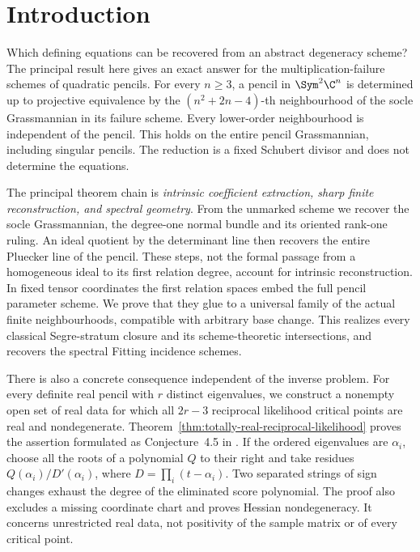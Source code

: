 \section{Introduction}
\label{sec:introduction-v132}

Which defining equations can be recovered from an abstract degeneracy
scheme?  The principal result here gives an exact answer for the
multiplication-failure schemes of quadratic pencils.  For every
\(n\ge3\), a pencil in \(\Sym^2\C^n\) is determined up to
projective equivalence by the \((n^2+2n-4)\)-th neighbourhood
of the socle Grassmannian in its failure scheme.  Every lower-order
neighbourhood is independent of the pencil.  This holds on the entire
pencil Grassmannian, including singular pencils.  The reduction is a
fixed Schubert divisor and does not determine the equations.

The principal theorem chain is
\emph{intrinsic coefficient extraction, sharp finite reconstruction,
and spectral geometry}.  From the unmarked scheme we recover the
socle Grassmannian, the degree-one normal bundle and its oriented
rank-one ruling.  An ideal quotient by the determinant line then
recovers the entire Pluecker line of the pencil.  These steps, not
the formal passage from a homogeneous ideal to its first relation
degree, account for intrinsic reconstruction.  In fixed tensor
coordinates the first relation spaces embed the full pencil parameter
scheme.  We prove that they glue to a universal family of the actual
finite neighbourhoods, compatible with arbitrary base change.  This
realizes every classical Segre-stratum closure and its scheme-theoretic
intersections, and recovers the spectral Fitting incidence schemes.

There is also a concrete consequence independent of the inverse
problem.  For every definite real pencil with \(r\) distinct
eigenvalues, we construct a nonempty open set of real data for which
all \(2r-3\) reciprocal likelihood critical points are real and
nondegenerate.  Theorem~\ref{thm:totally-real-reciprocal-likelihood}
proves the assertion formulated as Conjecture~4.5 in
\cite{FevolaMandelshtamSturmfels}.  If the ordered eigenvalues are
\(\alpha_i\), choose all the roots of a polynomial \(Q\)
to their right and take residues \(Q(\alpha_i)/D'(\alpha_i)\),
where \(D=\prod_i(t-\alpha_i)\).  Two separated strings of
sign changes exhaust the degree of the eliminated score polynomial.
The proof also excludes a missing coordinate chart and proves Hessian
nondegeneracy.  It concerns unrestricted real data, not positivity
of the sample matrix or of every critical point.

